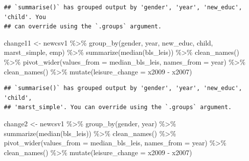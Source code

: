 \documentclass[
]{article}
\newenvironment{Shaded}{\begin{snugshade}}{\end{snugshade}}
\newcommand{\AttributeTok}[1]{\textcolor[rgb]{0.77,0.63,0.00}{#1}}
\newcommand{\FunctionTok}[1]{\textcolor[rgb]{0.00,0.00,0.00}{#1}}
\newcommand{\NormalTok}[1]{#1}
\newcommand{\OtherTok}[1]{\textcolor[rgb]{0.56,0.35,0.01}{#1}}
\newcommand{\SpecialCharTok}[1]{\textcolor[rgb]{0.00,0.00,0.00}{#1}}
\begin{document}
\begin{verbatim}
## `summarise()` has grouped output by 'gender', 'year', 'new_educ', 'child'. You
## can override using the `.groups` argument.
\end{verbatim}

\begin{Shaded}
\begin{Highlighting}[]
\NormalTok{change11 }\OtherTok{\textless{}{-}}\NormalTok{ newcsv1 }\SpecialCharTok{\%\textgreater{}\%}
  \FunctionTok{group\_by}\NormalTok{(gender,  year, new\_educ, child, marst\_simple, emp) }\SpecialCharTok{\%\textgreater{}\%}
  \FunctionTok{summarize}\NormalTok{(}\FunctionTok{median}\NormalTok{(bls\_leis)) }\SpecialCharTok{\%\textgreater{}\%}
  \FunctionTok{clean\_names}\NormalTok{() }\SpecialCharTok{\%\textgreater{}\%}
  \FunctionTok{pivot\_wider}\NormalTok{(}\AttributeTok{values\_from =}\NormalTok{ median\_bls\_leis, }\AttributeTok{names\_from =}\NormalTok{ year) }\SpecialCharTok{\%\textgreater{}\%}
  \FunctionTok{clean\_names}\NormalTok{() }\SpecialCharTok{\%\textgreater{}\%}
  \FunctionTok{mutate}\NormalTok{(}\AttributeTok{leisure\_change =}\NormalTok{ x2009 }\SpecialCharTok{{-}}\NormalTok{ x2007)}
\end{Highlighting}
\end{Shaded}

\begin{verbatim}
## `summarise()` has grouped output by 'gender', 'year', 'new_educ', 'child',
## 'marst_simple'. You can override using the `.groups` argument.
\end{verbatim}

\begin{Shaded}
\begin{Highlighting}[]
\NormalTok{change2 }\OtherTok{\textless{}{-}}\NormalTok{ newcsv1 }\SpecialCharTok{\%\textgreater{}\%}
  \FunctionTok{group\_by}\NormalTok{(gender, year) }\SpecialCharTok{\%\textgreater{}\%}
  \FunctionTok{summarize}\NormalTok{(}\FunctionTok{median}\NormalTok{(bls\_leis)) }\SpecialCharTok{\%\textgreater{}\%}
  \FunctionTok{clean\_names}\NormalTok{() }\SpecialCharTok{\%\textgreater{}\%}
  \FunctionTok{pivot\_wider}\NormalTok{(}\AttributeTok{values\_from =}\NormalTok{ median\_bls\_leis, }\AttributeTok{names\_from =}\NormalTok{ year) }\SpecialCharTok{\%\textgreater{}\%}
  \FunctionTok{clean\_names}\NormalTok{() }\SpecialCharTok{\%\textgreater{}\%}
  \FunctionTok{mutate}\NormalTok{(}\AttributeTok{leisure\_change =}\NormalTok{ x2009 }\SpecialCharTok{{-}}\NormalTok{ x2007)}
\end{Highlighting}
\end{Shaded}
\end{document}
